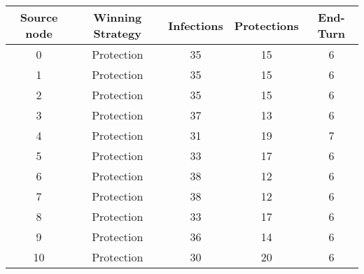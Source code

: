 \documentclass[results.tex]{subfiles}
\begin{document}
    \begin{center}
        \begin{tabular}{| c || c | c | c | c |}
            \hline
            {\bfseries Source node} & {\bfseries Winning Strategy} & {\bfseries Infections} & {\bfseries Protections}
            & {\bfseries End-Turn}
            \\  %
            \hline\hline
            0                       & Protection                   & 35                     & 15                      & 6                    \\
            \hline
            1                       & Protection                   & 35                     & 15                      & 6                    \\
            \hline
            2                       & Protection                   & 35                     & 15                      & 6                    \\
            \hline
            3                       & Protection                   & 37                     & 13                      & 6                    \\
            \hline
            4                       & Protection                   & 31                     & 19                      & 7                    \\
            \hline
            5                       & Protection                   & 33                     & 17                      & 6                    \\
            \hline
            6                       & Protection                   & 38                     & 12                      & 6                    \\
            \hline
            7                       & Protection                   & 38                     & 12                      & 6                    \\
            \hline
            8                       & Protection                   & 33                     & 17                      & 6                    \\
            \hline
            9                       & Protection                   & 36                     & 14                      & 6                    \\
            \hline
            10                      & Protection                   & 30                     & 20                      & 6                    \\

\end{tabular}
\end{center}
\end{document}
